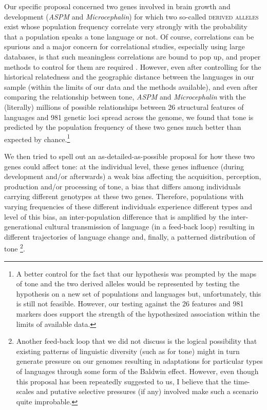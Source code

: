 \documentclass[output=paper]{langsci/langscibook}
\begin{document}
Our specific proposal concerned two genes involved in brain growth and development (\textit{ASPM} and \textit{Microcephalin}) for which two so-called \textsc{derived alleles}  exist whose population frequency correlate very strongly with the probability that a population speaks a tone language or not. Of course, correlations can be spurious and a major concern for correlational studies, especially using large databases, is that such meaningless correlations are bound to pop up, and proper methods to control for them are required \citep{LaddEtAl2015}. However, even after controlling for the historical relatedness and the geographic distance between the languages in our sample (within the limits of our data and the methods available), and even after comparing the relationship between tone, \textit{ASPM} and \textit{Microcephalin} with the (literally) millions of possible relationships between 26 structural features of languages and 981 genetic loci spread across the genome, we found that tone is predicted by the population frequency of these two genes much better than expected by chance.\footnote{A better control for the fact that our hypothesis was prompted by the maps of tone and the two derived alleles would be represented by testing the hypothesis on a new set of populations and languages but, unfortunately, this is still not feasible. However, our testing against the 26 features and 981 markers does support the strength of the hypothesized association within the limits of available data.}

    
We then tried to spell out an as-detailed-as-possible proposal for how these two genes could affect tone: at the individual level, these genes influence (during development and/or afterwards) a weak bias affecting the acquisition, perception, production and/or processing of tone, a bias that differs among individuals carrying different genotypes at these two genes. Therefore, populations with varying frequencies of these different individuals experience different types and level of this bias, an inter-population difference that is amplified by the inter-generational cultural transmission of language (in a feed-back loop) resulting in different trajectories of language change and, finally, a patterned distribution of tone \citep{Dediu2011b,Dediu2007}\footnote{Another feed-back loop that we did not discuss is the logical possibility that existing patterns of linguistic diversity (such as for tone) might in turn generate pressure on our genomes resulting in adaptations for particular types of languages through some form of the Baldwin effect. However, even though this proposal has been repeatedly suggested to us, I believe that the time-scales and putative selective pressures (if any) involved make such a scenario quite improbable.}. 
\end{document}
